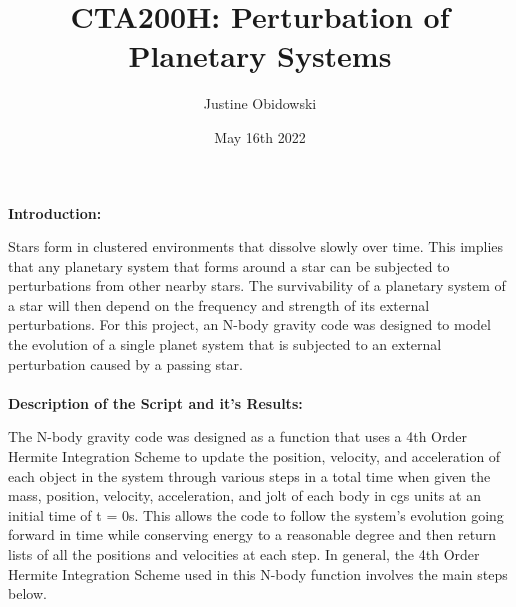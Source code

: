 \documentclass{article}
\title{CTA200H: Perturbation of Planetary Systems}
\author{Justine Obidowski}
\date{May 16th 2022}
\begin{document}
\maketitle

\newpage
\noindent\textbf{Introduction:}
\\
\text\par{Stars form in clustered environments that dissolve slowly over time. This implies that any planetary system that forms around a star can be subjected to perturbations from other nearby stars. The survivability of a planetary system of a star will then depend on the frequency and strength of its external perturbations. For this project, an N-body gravity code was designed to model the evolution of a single planet system that is subjected to an external perturbation caused by a passing star.}
\\
\\
\noindent\textbf{Description of the Script and it’s Results:}
\\
\text\par{The N-body gravity code was designed as a function that uses a 4th Order Hermite Integration Scheme to update the position, velocity, and acceleration of each object in the system through various steps in a total time when given the mass, position, velocity, acceleration, and jolt of each body in cgs units at an initial time of t = 0s. This allows the code to follow the system's evolution going forward in time while conserving energy to a reasonable degree and then return lists of all the positions and velocities at each step. In general, the 4th Order Hermite Integration Scheme used in this N-body function involves the main steps below.}
\\
\\
\end{document}
